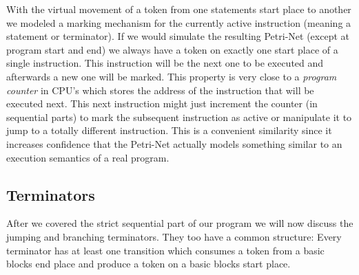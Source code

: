 With the virtual movement of a token from one statements start place to another we modeled a marking mechanism for the currently active instruction (meaning a statement or terminator).
If we would simulate the resulting Petri-Net (except at program start and end) we always have a token on exactly one start place of a single instruction.
This instruction will be the next one to be executed and afterwards a new one will be marked.
This property is very close to a \textit{program counter} in CPU's which stores the address of the instruction that will be executed next.
This next instruction might just increment the counter (in sequential parts) to mark the subsequent instruction as active or manipulate it to jump to a totally different instruction.
This is a convenient similarity since it increases confidence that the Petri-Net actually models something similar to an execution semantics of a real program.

\subsection{Terminators}
After we covered the strict sequential part of our program we will now discuss the jumping and branching terminators.
They too have a common structure:
Every terminator has at least one transition which consumes a token from a basic blocks end place and produce a token on a basic blocks start place.

